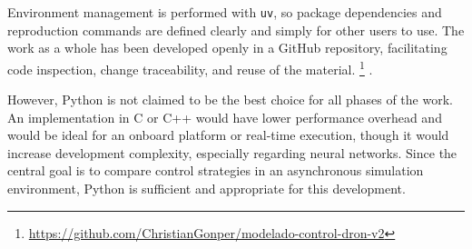 Environment management is performed with \texttt{uv}, so package dependencies and reproduction commands are defined clearly and simply for other users to use. The work as a whole has been developed openly in a GitHub repository, facilitating code inspection, change traceability, and reuse of the material. \footnote{\url{https://github.com/ChristianGonper/modelado-control-dron-v2}}
\cite{pytorchDocs,uvDocs,githubDocs}.

However, Python is not claimed to be the best choice for all phases of the work. An implementation in C or C++ would have lower performance overhead and would be ideal for an onboard platform or real-time execution, though it would increase development complexity, especially regarding neural networks. Since the central goal is to compare control strategies in an asynchronous simulation environment, Python is sufficient and appropriate for this development.
